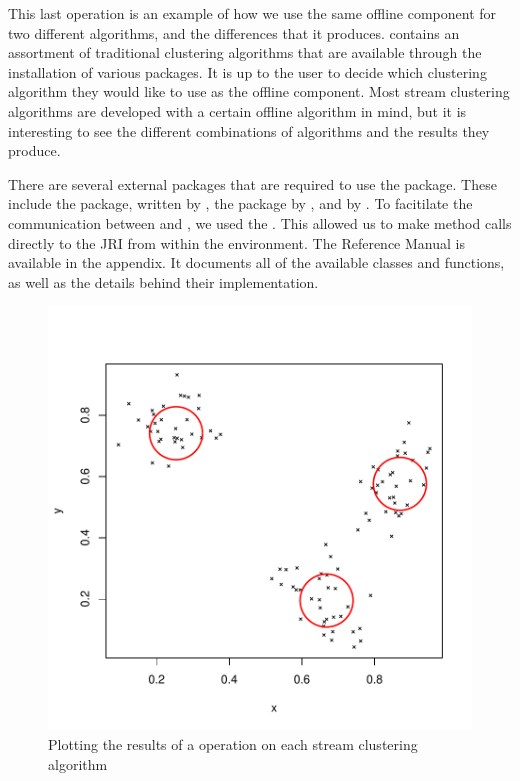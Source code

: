 \documentclass[nojss]{jss}
\begin{document}
\begin{Schunk}
\end{Schunk}

This last operation is an example of how we use the same offline component for two different algorithms, and the differences that it produces.  contains an assortment of traditional clustering algorithms that are available through the installation of various packages. It is up to the user to decide which clustering algorithm they would like to use as the offline component. Most stream clustering algorithms are developed with a certain offline algorithm in mind, but it is interesting to see the different combinations of algorithms and the results they produce.


There are several external packages that are required to use the  package. These include the  package, written by \cite{stream:Meyer+Buchta:2010}, the  package by \cite{stream:Venables+Ripley:2002}, and  by \cite{stream:Qiu+Joe:2009}. To facitilate the communication between  and , we used the  \citep{stream:Urbanek:2010}. This allowed us to make method calls directly to the JRI from within the  environment. The  Reference Manual is available in the appendix. It documents all of the available classes and functions, as well as the details behind their implementation.

\begin{figure}
\centering
\includegraphics[width=.5\linewidth]{stream-plot4}
\caption{Plotting the results of a  operation on each stream clustering algorithm}
\label{figure:plot4}
\end{figure}
\end{document}
